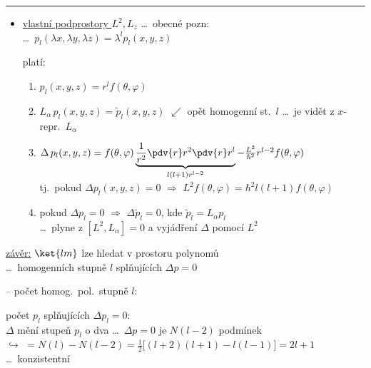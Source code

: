 \rule{\linewidth}{0.3pt}
\begin{itemize}
  \item \underline{vlastní podprostory $L^2, L_z$} \dots\ obecné pozn: \\
   \dots\ $p_l(\lambda x,\lambda y,\lambda z) = \lambda^l p_l(x,y,z)$


  platí:
  \begin{enumerate}[label=\arabic*)]
    \item $p_l(x,y,z) = r^l f(\theta,\varphi)$
    \item $L_\alpha\,p_l(x,y,z) = \tilde p_l(x,y,z)$ \quad $\swarrow$ opět homogenní st.\ $l$ \dots\ je vidět z $x$-repr.\ $L_\alpha$
    \item $\Delta\,p_l(x,y,z) = f(\theta,\varphi)\underbrace{\frac{1}{r^2}\pdv{r}r^2\pdv{r}r^l}_{l(l+1)r^{l-2}} - \frac{L^2}{\hbar^2}r^{l-2}f(\theta,\varphi)$ \\
    tj.\ pokud $\Delta p_l(x,y,z) = 0$ \quad $\Rightarrow$ \quad $L^2f(\theta,\varphi) = \hbar^2 l(l+1)f(\theta,\varphi)$
    \item pokud $\Delta p_l = 0$ \quad $\Rightarrow$ \quad $\Delta\tilde p_l = 0$, \quad kde $\tilde p_l = L_\alpha p_l$ \\
    \dots\ plyne z $[L^2,L_\alpha] = 0$ a vyjádření $\Delta$ pomocí $L^2$
  \end{enumerate}
\end{itemize}

\underline{závěr:} $\ket{lm}$ lze hledat v prostoru polynomů \\
\hspace*{1.6cm} \dots\ homogenních stupně $l$ splňujících $\Delta p = 0$

-- počet homog.\ pol.\ stupně $l$: \\
\quad {}

počet $p_l$ splňujících $\Delta p_l = 0$: \\
\quad $\Delta$ mění stupeň $p_l$ o dva \dots\ $\Delta p = 0$ je $N(l-2)$ podmínek \\
\quad $\hookrightarrow$ $= N(l) - N(l-2) = \frac12\big[(l+2)(l+1) - l(l-1)\big] = 2l + 1$ \quad \dots\ konzistentní

